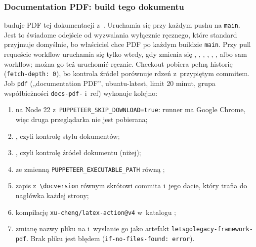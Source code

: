 \subsubsection{Documentation PDF: build tego dokumentu}\label{sec:rdzen-ci-pdf}

 buduje PDF tej dokumentacji
z~. Uruchamia się przy każdym pushu na
\texttt{main}. Jest to świadome odejście od wyzwalania wyłącznie ręcznego, które standard
przyjmuje domyślnie, bo właściciel chce PDF po każdym buildzie \texttt{main}. Przy pull
requeście workflow uruchamia się tylko wtedy, gdy zmienia się ,
, , ,
, ,  albo sam
workflow; można go też uruchomić ręcznie. Checkout pobiera pełną historię
(\texttt{fetch-depth: 0}), bo kontrola źródeł porównuje rdzeń z~przypiętym commitem. Job \texttt{pdf} („documentation PDF”, ubuntu-latest, limit 20 minut, grupa
współbieżności \texttt{docs-pdf-} i~ref) wykonuje kolejno:

\begin{enumerate}
  \item {} na Node 22 z~\texttt{PUPPETEER\_SKIP\_DOWNLOAD=true}: runner ma
        Google Chrome, więc druga przeglądarka nie jest pobierana;
  \item {}, czyli kontrolę stylu dokumentów;
  \item {}, czyli kontrolę źródeł dokumentu (niżej);
  \item {} ze zmienną
        \texttt{PUPPETEER\_EXECUTABLE\_PATH} równą ;
  \item zapis  z~\texttt{\textbackslash docversion} równym
        skrótowi commita i~jego dacie, który trafia do nagłówka każdej strony;
  \item kompilację \texttt{xu-cheng/latex-action@v4} w~katalogu ;
  \item zmianę nazwy pliku na  i~wysłanie go jako
        artefakt \texttt{letsgolegacy-framework-pdf}. Brak pliku jest błędem
        (\texttt{if-no-files-found: error}).
\end{enumerate}

